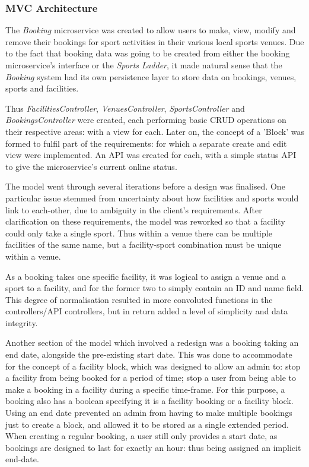 \subsubsection{MVC Architecture}
\par
The \textit{Booking} microservice was created to allow users to make, view, modify and remove their bookings for sport activities in their various local sports venues. Due to the fact that booking data was going to be created from either the booking microservice's interface or the \textit{Sports Ladder}, it made natural sense that the \textit{Booking} system had its own persistence layer to store data on bookings, venues, sports and facilities. 
\par
Thus \textit{FacilitiesController}, \textit{VenuesController}, \textit{SportsController} and \textit{BookingsController} were created, each performing basic CRUD operations on their respective areas: with a view for each. Later on, the concept of a 'Block' was formed to fulfil part of the requirements: for which a separate create and edit view were implemented. An API was created for each, with a simple status API to give the microservice's current online status. 
\par 
The model went through several iterations before a design was finalised. One particular issue stemmed from uncertainty about how facilities and sports would link to each-other, due to ambiguity in the client's requirements. After clarification on these requirements, the model was reworked so that a facility could only take a single sport. Thus within a venue there can be multiple facilities of the same name, but a facility-sport combination must be unique within a venue. 
\par 
As a booking takes one specific facility, it was logical to assign a venue and a sport to a facility, and for the former two to simply contain an ID and name field. This degree of normalisation resulted in more convoluted functions in the controllers/API controllers, but in return added a level of simplicity and data integrity. 
\par
Another section of the model which involved a redesign was a booking taking an end date, alongside the pre-existing start date. This was done to accommodate for the concept of a facility block, which was designed to allow an admin to: stop a facility from being booked for a period of time; stop a user from being able to make a booking in a facility during a specific time-frame. For this purpose, a booking also has a boolean specifying it is a facility booking or a facility block. Using an end date prevented an admin from having to make multiple bookings just to create a block, and allowed it to be stored as a single extended period. When creating a regular booking, a user still only provides a start date, as bookings are designed to last for exactly an hour: thus being assigned an implicit end-date. 
